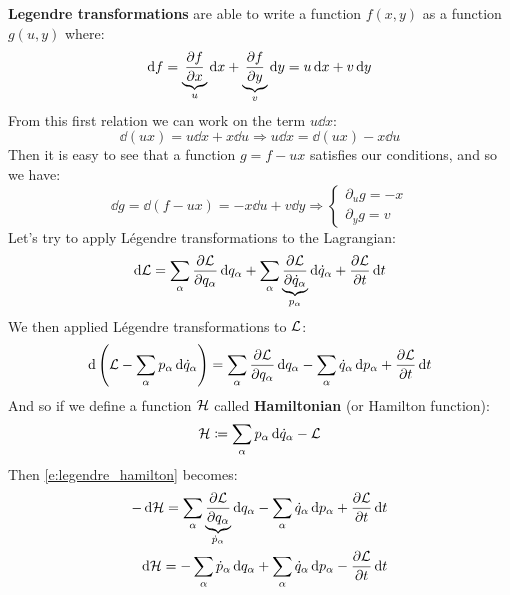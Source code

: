\textbf{Legendre transformations} are able to write a function $f(x,y)$ as a function $g(u,y)$ where:
\begin{equation}
    \dd{f} = \underbrace{\pdv{f}{x}}_u \dd{x} + \underbrace{\pdv{f}{y}}_v \dd{y} = u\dd{x} + v\dd{y}
\end{equation}
From this first relation we can work on the term $u\dd{x}$:
\begin{equation}
    \dd{(ux)} = u\dd{x} + x\dd{u} \Rightarrow u\dd{x} = \dd{(ux)} - x\dd{u}
\end{equation}
Then it is easy to see that a function $g = f-ux$ satisfies our conditions, and so we have:
\begin{equation}
    \dd{g} = \dd{(f-ux)} = - x\dd{u} + v\dd{y} \Rightarrow \begin{cases}
        \partial_{u} g = -x\\
        \partial_{y} g = v
    \end{cases}
\end{equation}
Let's try to apply Légendre transformations to the Lagrangian:
\begin{equation}
    \dd{\lagr} = \bigsum_{\alpha} \pdv{\lagr}{q_{\alpha}}\dd{q_{\alpha}} + \bigsum_{\alpha} \underbrace{\pdv{\lagr}{\dot{q}_{\alpha}}}_{p_{\alpha}}\dd{\dot{q}_{\alpha}} + \pdv{\lagr}{t}\dd{t}
\end{equation}
We then applied Légendre transformations to $\mathcal{L}$:
\begin{equation} \label{e:legendre_hamilton}
    \dd{\brackets{\lagr - \bigsum_{\alpha} p_{\alpha}\dd{\dot{q}_{\alpha}}}} = \bigsum_{\alpha} \pdv{\lagr}{q_{\alpha}}\dd{q_{\alpha}} - \bigsum_{\alpha} \dot{q}_{\alpha}\dd{p_{\alpha}} + \pdv{\lagr}{t}\dd{t}
\end{equation}
And so if we define a function $\mathcal{H}$ called \textbf{Hamiltonian} (or Hamilton function):
\begin{equation}
    \mathcal{H} \coloneqq \displaystyle\sum_{\alpha} p_{\alpha}\dd{\dot{q}_{\alpha}} -\mathcal{L}
\end{equation}
Then \eqref{e:legendre_hamilton} becomes:
\begin{equation}
    \begin{split}
        -\dd{\hamfun} = \bigsum_{\alpha} \underbrace{\pdv{\lagr}{q_{\alpha}}}_{\dot{p}_{\alpha}}\dd{q_{\alpha}} - \bigsum_{\alpha} \dot{q}_{\alpha}\dd{p_{\alpha}} + \pdv{\lagr}{t}\dd{t}\\
        \dd{\hamfun} = -\bigsum_{\alpha} \dot{p}_{\alpha}\dd{q_{\alpha}} + \bigsum_{\alpha} \dot{q}_{\alpha}\dd{p_{\alpha}} - \pdv{\lagr}{t}\dd{t}\\
    \end{split}
\end{equation}
